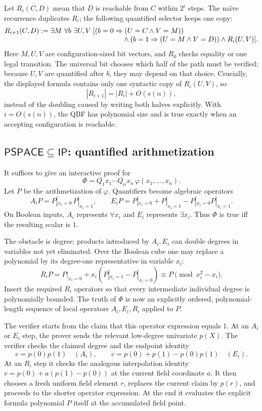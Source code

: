 \documentclass[10pt]{article}
\newcommand{\IP}{\mathsf{IP}}
\newcommand{\PSPACE}{\mathsf{PSPACE}}
\begin{document}
Let $R_i(C,D)$ mean that $D$ is reachable from $C$ within $2^i$ steps.
The na\"ive recurrence duplicates $R_i$; the following quantified selector keeps
one copy:
\[
\begin{split}
R_{i+1}(C,D):={}&\exists M\ \forall b\ \exists U,V\;[
 (b=0\Rightarrow(U=C\wedge V=M))\\[-1mm]
&\hspace{36mm}\wedge
 (b=1\Rightarrow(U=M\wedge V=D))
 \wedge R_i(U,V)].
\end{split}
\]
Here $M,U,V$ are configuration-sized bit vectors, and $R_0$ checks equality or
one legal transition.  The universal bit chooses which half of the path must be
verified; because $U,V$ are quantified after $b$, they may depend on that choice.
Crucially, the displayed formula contains only one syntactic copy of $R_i(U,V)$, so
\[
 |R_{i+1}|=|R_i|+O(s(n)),
\]
instead of the doubling caused by writing both halves explicitly.  With
$i=O(s(n))$, the QBF has polynomial size and is true exactly when an accepting
configuration is reachable.

\subsection{$\PSPACE\subseteq\IP$: quantified arithmetization}

It suffices to give an interactive proof for
\[
 \Phi=Q_1x_1\cdots Q_nx_n\,\varphi(x_1,\ldots,x_n).
\]
Let $P$ be the arithmetization of $\varphi$.  Quantifiers become algebraic
operators
\[
 A_iP=P|_{x_i=0}\,P|_{x_i=1},\qquad
 E_iP=P|_{x_i=0}+P|_{x_i=1}-P|_{x_i=0}P|_{x_i=1}.
\]
On Boolean inputs, $A_i$ represents $\forall x_i$ and $E_i$ represents
$\exists x_i$.  Thus $\Phi$ is true iff the resulting scalar is $1$.

The obstacle is degree: products introduced by $A_i,E_i$ can double degrees in
variables not yet eliminated.  Over the Boolean cube one may replace a polynomial
by its degree-one representative in variable $x_i$:
\[
 R_iP=P|_{x_i=0}+x_i(P|_{x_i=1}-P|_{x_i=0})
      \equiv P\pmod{x_i^2-x_i}.
\]
Insert the required $R_i$ operators so that every intermediate individual degree
is polynomially bounded.  The truth of $\Phi$ is now an explicitly ordered,
polynomial-length sequence of local operators $A_i,E_i,R_i$ applied to $P$.

The verifier starts from the claim that this operator expression equals $1$.
At an $A_i$ or $E_i$ step, the prover sends the relevant low-degree univariate
$p(X)$.  The verifier checks the claimed degree and the endpoint identity
\[
 v=p(0)p(1)\quad(A_i),\qquad
 v=p(0)+p(1)-p(0)p(1)\quad(E_i).
\]
At an $R_i$ step it checks the analogous interpolation identity
$v=p(0)+a(p(1)-p(0))$ at the current field coordinate $a$.
It then chooses a fresh uniform field element $r$, replaces the current claim by
$p(r)$, and proceeds to the shorter operator expression.  At the end it evaluates
the explicit formula polynomial $P$ itself at the accumulated field point.
\end{document}
